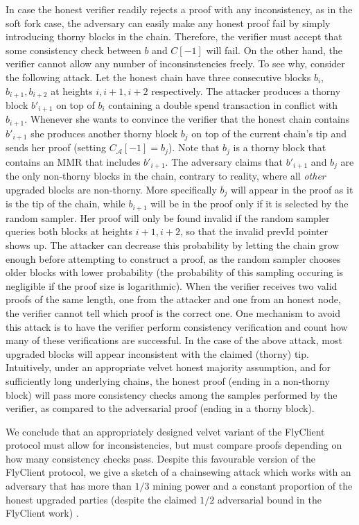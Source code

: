	In case the honest verifier readily rejects a proof with any inconsistency, as in the soft fork case, the adversary can easily make any honest proof fail
	by simply introducing thorny blocks in the chain. Therefore, the verifier must accept that some consistency check between $b$ and $C[-1]$ will fail.
	On the other hand, the verifier cannot allow any number of inconsinstencies freely. To see why,
	consider the following attack. Let the honest chain have three consecutive blocks $b_i$, $b_{i+1}, b_{i+2}$ at heights $i, i+1, i+2$ respectively. The attacker produces a thorny block $b'_{i+1}$ on top of $b_i$ containing a double spend transaction in conflict with $b_{i+1}$.
	Whenever she wants to convince the verifier that the honest chain contains $b'_{i+1}$ she produces another thorny block $b_j$ on top of the current chain's tip and sends her proof (setting $C_\mathcal{A}[-1] = b_j$). Note that $b_j$ is a thorny block that contains an MMR that includes
	$b'_{i+1}$. The adversary claims that $b'_{i+1}$ and $b_j$ are the only non-thorny blocks in the chain, contrary to reality, where all \emph{other} upgraded blocks are non-thorny.
	More specifically $b_j$ will appear in the proof as it is the tip of the chain, while $b_{i+1}$ will be in the proof
	only if it is selected by the random sampler. Her proof will only be found invalid if the random sampler queries both blocks at heights $i+1, i+2$, so that the invalid prevId pointer shows up. The attacker can decrease this probability
	by letting the chain grow enough before attempting to construct a proof, as the random sampler chooses older blocks with lower probability (the probability of this sampling occuring is negligible if the proof size is logarithmic). When the verifier receives two valid proofs of the same length, one from the attacker and one from an honest node,
	the verifier cannot tell which proof is the correct one. One mechanism to avoid this attack is to have the verifier perform consistency verification and count how many of
	these verifications are successful. In the case of the above attack, most upgraded blocks will appear inconsistent with the claimed (thorny) tip.
	Intuitively, under an appropriate velvet honest majority assumption, and for sufficiently long underlying chains, the honest proof (ending in a non-thorny block)
	will pass more consistency checks among the samples performed
	by the verifier, as compared to the adversarial proof (ending in a thorny block).

	We conclude that an appropriately designed velvet variant of the FlyClient protocol must allow for inconsistencies, but must compare proofs depending on how many
	consistency checks pass. Despite this favourable version of the FlyClient protocol, we give a sketch of a chainsewing attack which works
	with an adversary that has more than $1/3$ mining power and a constant proportion of the honest upgraded parties (despite the claimed $1/2$ adversarial bound in the FlyClient work) .


